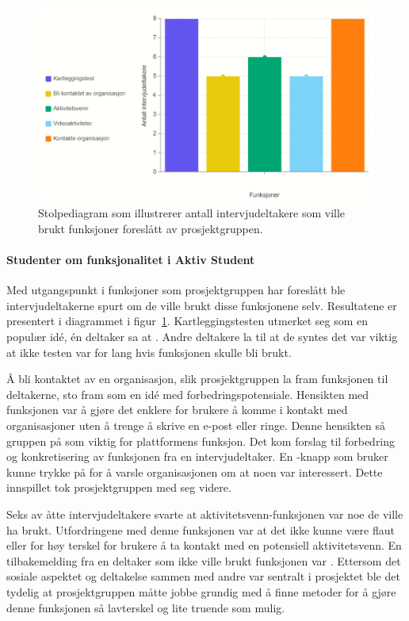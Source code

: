 \begin{figure}[H]
\includegraphics[width=\textwidth]{Illustrasjoner/diagram-funksjoner.png}
\caption{Stolpediagram som illustrerer antall intervjudeltakere som ville brukt funksjoner foreslått av prosjektgruppen.}
\label{fig:diagram-funksjoner}
\end{figure}

\paragraph{Studenter om funksjonalitet i Aktiv Student}

Med utgangspunkt i funksjoner som prosjektgruppen har foreslått ble intervjudeltakerne spurt om de ville brukt disse funksjonene selv. Resultatene er presentert i diagrammet i figur~\ref{fig:diagram-funksjoner}. Kartleggingstesten utmerket seg som en populær idé, én deltaker sa at . Andre deltakere la til at de syntes det var viktig at ikke testen var for lang hvis funksjonen skulle bli brukt.

Å bli kontaktet av en organisasjon, slik prosjektgruppen la fram funksjonen til deltakerne, sto fram som en idé med forbedringspotensiale. Hensikten med funksjonen var å gjøre det enklere for brukere å komme i kontakt med organisasjoner uten å trenge å skrive en e-post eller ringe. Denne hensikten så gruppen på som viktig for plattformens funksjon. Det kom forslag til forbedring og konkretisering av funksjonen fra en intervjudeltaker. En -knapp som bruker kunne trykke på for å varsle organisasjonen om at noen var interessert. Dette innspillet tok prosjektgruppen med seg videre.

Seks av åtte intervjudeltakere svarte at aktivitetsvenn-funksjonen var noe de ville ha brukt. Utfordringene med denne funksjonen var at det ikke kunne være flaut eller for høy terskel for brukere å ta kontakt med en potensiell aktivitetsvenn. En tilbakemelding fra en deltaker som ikke ville brukt funksjonen var . Ettersom det sosiale aspektet og deltakelse sammen med andre var sentralt i prosjektet ble det tydelig at prosjektgruppen måtte jobbe grundig med å finne metoder for å gjøre denne funksjonen så lavterskel og lite truende som mulig. 

